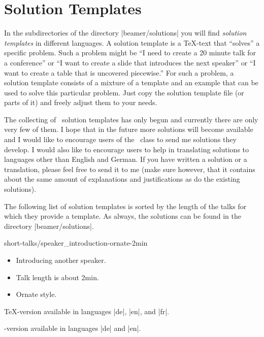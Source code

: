 %
%
%


\section{Solution Templates}
\label{section-solutions}

In the subdirectories of the directory |beamer/solutions| you will find \emph{solution templates} in different languages. A solution template is a \TeX-text that ``solves'' a specific problem. Such a problem might be ``I need to create a 20 minute talk for a conference'' or ``I want to create a slide that introduces the next speaker'' or ``I want to create a table that is uncovered piecewise.'' For such a problem, a solution template consists of a mixture of a template and an example that can be used to solve this particular problem. Just copy the solution template file (or parts of it) and freely adjust them to your needs.

The collecting of \beamer\ solution templates has only begun and currently there are only very few of them. I hope that in the future more solutions will become available and I would like to encourage users of the \beamer\ class to send me solutions they develop. I would also like to encourage users to help in translating solutions to languages other than English and German. If you have written a solution or a translation, please feel free to send it to me (make sure however, that it contains about the same amount of explanations and justifications as do the existing solutions).

The following list of solution templates is sorted by the length of the talks for which they provide a template. As always, the solutions can be found in the directory |beamer/solutions|.

\begin{solution}{short-talks/speaker\_introduction-ornate-2min}
  \begin{itemize}
  \item
    Introducing another speaker.
  \item
    Talk length is about 2min.
  \item
    Ornate style.
  \end{itemize}

  \beamernote
  \TeX-version available in languages |de|, |en|, and |fr|.

  \lyxnote
  \LyX-version available in languages |de| and |en|.
\end{solution}


